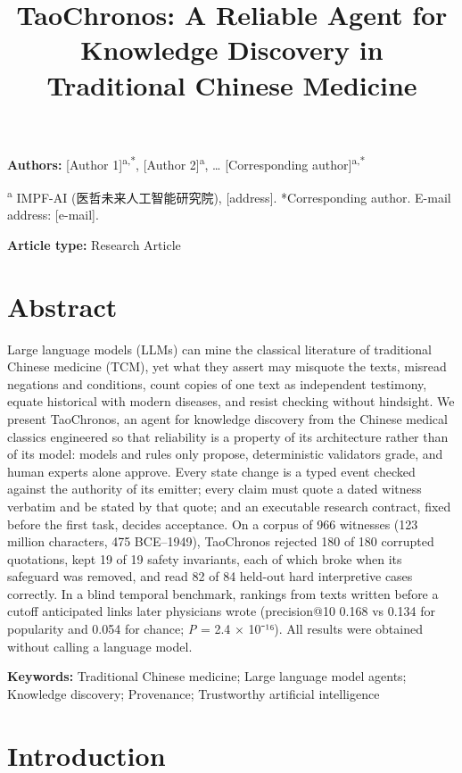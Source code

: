 \documentclass[
]{article}
\title{TaoChronos: A Reliable Agent for Knowledge Discovery in
Traditional Chinese Medicine}
\author{}
\date{}
\begin{document}
\maketitle

\textbf{Authors:} {[}Author 1{]}\textsuperscript{a,*}, {[}Author
2{]}\textsuperscript{a}, \ldots{} {[}Corresponding
author{]}\textsuperscript{a,*}

\textsuperscript{a} IMPF-AI (医哲未来人工智能研究院), {[}address{]}.
*Corresponding author. E-mail address: {[}e-mail{]}.

\textbf{Article type:} Research Article

\hypertarget{abstract}{%
\section*{Abstract}\label{abstract}}

Large language models (LLMs) can mine the classical literature of
traditional Chinese medicine (TCM), yet what they assert may misquote
the texts, misread negations and conditions, count copies of one text as
independent testimony, equate historical with modern diseases, and
resist checking without hindsight. We present TaoChronos, an agent for
knowledge discovery from the Chinese medical classics engineered so that
reliability is a property of its architecture rather than of its model:
models and rules only propose, deterministic validators grade, and human
experts alone approve. Every state change is a typed event checked
against the authority of its emitter; every claim must quote a dated
witness verbatim and be stated by that quote; and an executable research
contract, fixed before the first task, decides acceptance. On a corpus
of 966 witnesses (123 million characters, 475 BCE--1949), TaoChronos
rejected 180 of 180 corrupted quotations, kept 19 of 19 safety
invariants, each of which broke when its safeguard was removed, and read
82 of 84 held-out hard interpretive cases correctly. In a blind temporal
benchmark, rankings from texts written before a cutoff anticipated links
later physicians wrote (precision@10 0.168 vs 0.134 for popularity and
0.054 for chance; \emph{P} = 2.4 × 10⁻¹⁶). All results were obtained
without calling a language model.

\textbf{Keywords:} Traditional Chinese medicine; Large language model
agents; Knowledge discovery; Provenance; Trustworthy artificial
intelligence

\hypertarget{introduction}{%
\section{Introduction}\label{introduction}}
\end{document}
